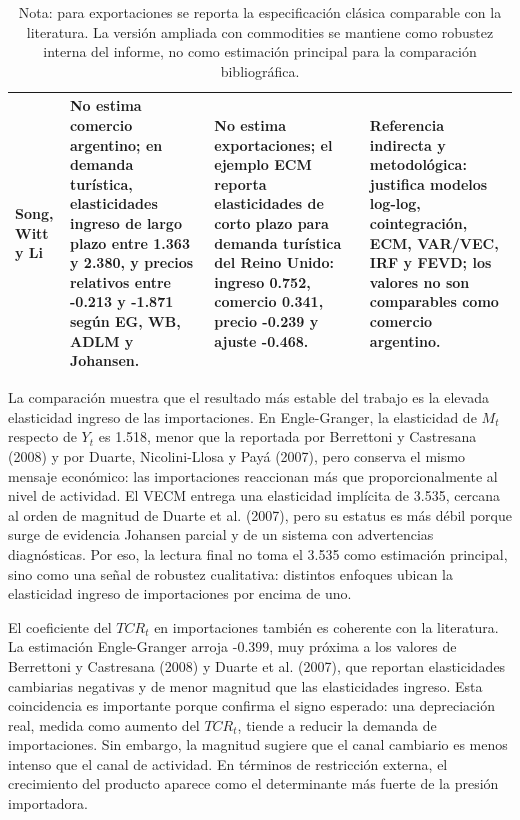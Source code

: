 \documentclass[11pt,a4paper]{article}
\begin{document}
\begin{table}[H]
\begin{tabular}{p{2.8cm}p{3.2cm}p{3.2cm}p{4.1cm}}
Song, Witt y Li \cite{song_witt_li_2008} & No estima comercio argentino; en demanda turística, elasticidades ingreso de largo plazo entre 1.363 y 2.380, y precios relativos entre -0.213 y -1.871 según EG, WB, ADLM y Johansen. & No estima exportaciones; el ejemplo ECM reporta elasticidades de corto plazo para demanda turística del Reino Unido: ingreso 0.752, comercio 0.341, precio -0.239 y ajuste -0.468. & Referencia indirecta y metodológica: justifica modelos log-log, cointegración, ECM, VAR/VEC, IRF y FEVD; los valores no son comparables como comercio argentino. \\
\bottomrule
\end{tabular}
\caption*{\footnotesize Nota: para exportaciones se reporta la especificación
clásica comparable con la literatura. La versión ampliada con commodities se
mantiene como robustez interna del informe, no como estimación principal para la
comparación bibliográfica.}
\end{table}

	La comparación muestra que el resultado más estable del trabajo es la elevada
	elasticidad ingreso de las importaciones. En Engle-Granger, la elasticidad de
	\(M_t\) respecto de \(Y_t\) es 1.518, menor que la reportada por Berrettoni y
	Castresana (2008) y por Duarte, Nicolini-Llosa y Payá (2007), pero conserva el
	mismo mensaje económico: las importaciones reaccionan más que
	proporcionalmente al nivel de actividad. El VECM entrega una elasticidad
	implícita de 3.535, cercana al orden de magnitud de Duarte et al. (2007), pero
	su estatus es más débil porque surge de evidencia Johansen parcial y de un
	sistema con advertencias diagnósticas. Por eso, la lectura final no toma el
	3.535 como estimación principal, sino como una señal de robustez cualitativa:
	distintos enfoques ubican la elasticidad ingreso de importaciones por encima de
	uno.

	El coeficiente del \(TCR_t\) en importaciones también es coherente con la
	literatura. La estimación Engle-Granger arroja -0.399, muy próxima a los valores
	de Berrettoni y Castresana (2008) y Duarte et al. (2007), que reportan
	elasticidades cambiarias negativas y de menor magnitud que las elasticidades
	ingreso. Esta coincidencia es importante porque confirma el signo esperado:
	una depreciación real, medida como aumento del \(TCR_t\), tiende a reducir la
	demanda de importaciones. Sin embargo, la magnitud sugiere que el canal
	cambiario es menos intenso que el canal de actividad. En términos de
	restricción externa, el crecimiento del producto aparece como el determinante
	más fuerte de la presión importadora.
\end{document}
